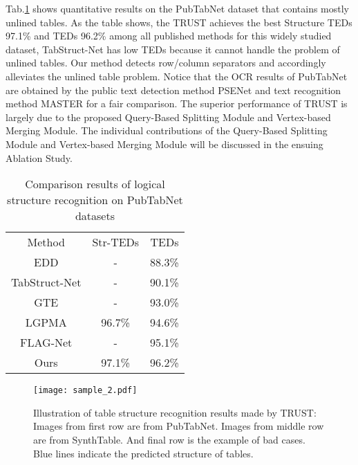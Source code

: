 \documentclass[lettersize,journal]{IEEEtran}
\begin{document}
Tab.\ref{table:Pubtabnet} shows quantitative results on the PubTabNet dataset that contains mostly unlined tables. As the table shows, the TRUST achieves the best Structure TEDs 97.1\% and TEDs 96.2\% among all published methods for this widely studied dataset, TabStruct-Net\cite{raja2020table} has low TEDs because it cannot handle the problem of unlined tables. Our method detects row/column separators and accordingly alleviates the unlined table problem. Notice that the OCR results of PubTabNet are obtained by the public text detection method PSENet\cite{wang2019shape} and text recognition method MASTER\cite{lu2021master} for a fair comparison. The superior performance of TRUST is largely due to the proposed Query-Based Splitting Module and Vertex-based Merging Module. The individual contributions of the Query-Based Splitting Module and Vertex-based Merging Module will be discussed in the ensuing Ablation Study.








\setlength{\tabcolsep}{4pt}
\begin{table}
\begin{center}
\caption{Comparison results of logical structure recognition on PubTabNet datasets}
\label{table:Pubtabnet}
\begin{tabular}{ccc}
\hline\noalign{\smallskip}
Method & Str-TEDs & TEDs\\
\noalign{\smallskip}
\hline
\noalign{\smallskip}
EDD\cite{zhong2020image}  & -  & 88.3\% \\
TabStruct-Net\cite{raja2020table} & - & 90.1\%  \\
GTE\cite{zheng2021global} & -  &  93.0\%  \\
LGPMA\cite{qiao2021lgpma} & 96.7\% & 94.6\% \\
FLAG-Net\cite{liu2021show} & - & 95.1\% \\
\hline
Ours & 97.1\% & 96.2\% \\
\hline
\end{tabular}
\end{center}
\end{table}
\setlength{\tabcolsep}{1.4pt}


\begin{figure*}[htbp]
\centering
\texttt{[image: sample\_2.pdf]}
\caption{Illustration of table structure recognition results made by TRUST: Images from first row are from PubTabNet. Images from middle row are from SynthTable. And final row is the example of bad cases. Blue lines indicate the predicted structure of tables. }
\label{fig:qualitative results}
\end{figure*}
\end{document}
